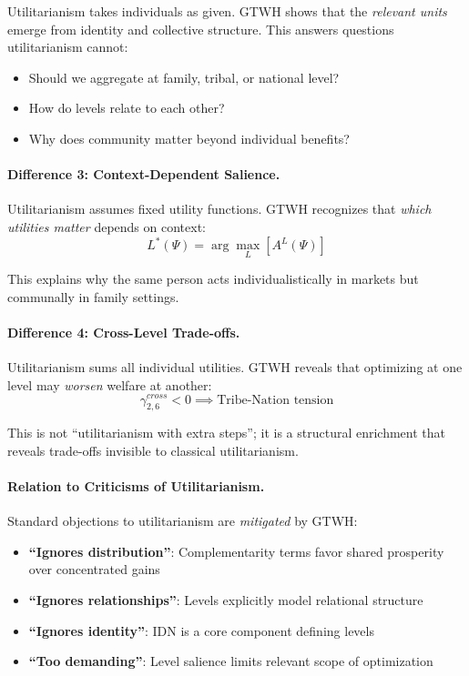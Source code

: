 \documentclass[12pt,a4paper]{article}
\begin{document}
Utilitarianism takes individuals as given. GTWH shows that the \textit{relevant 
units} emerge from identity and collective structure. This answers questions 
utilitarianism cannot:
\begin{itemize}[nosep]
\item Should we aggregate at family, tribal, or national level?
\item How do levels relate to each other?
\item Why does community matter beyond individual benefits?
\end{itemize}

\paragraph{Difference 3: Context-Dependent Salience.}

Utilitarianism assumes fixed utility functions. GTWH recognizes that 
\textit{which utilities matter} depends on context:
\begin{equation}
L^*(\Psi) = \arg\max_L [A^L(\Psi)]
\end{equation}

This explains why the same person acts individualistically in markets but 
communally in family settings.

\paragraph{Difference 4: Cross-Level Trade-offs.}

Utilitarianism sums all individual utilities. GTWH reveals that optimizing 
at one level may \textit{worsen} welfare at another:
\begin{equation}
\gamma^{cross}_{2,6} < 0 \implies \text{Tribe-Nation tension}
\end{equation}

This is not ``utilitarianism with extra steps''; it is a structural enrichment 
that reveals trade-offs invisible to classical utilitarianism.

\paragraph{Relation to Criticisms of Utilitarianism.}

Standard objections to utilitarianism are \textit{mitigated} by GTWH:

\begin{itemize}
\item \textbf{``Ignores distribution''}: Complementarity terms favor 
shared prosperity over concentrated gains
\item \textbf{``Ignores relationships''}: Levels explicitly model relational 
structure
\item \textbf{``Ignores identity''}: IDN is a core component defining levels
\item \textbf{``Too demanding''}: Level salience limits relevant scope of 
optimization
\end{itemize}
\end{document}
